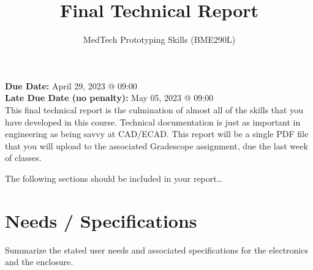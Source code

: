 \documentclass[10pt]{article}
\begin{document}
\title{Final Technical Report} 
\author{MedTech Prototyping Skills (BME290L)}
\maketitle

\textbf{Due Date:} April 29, 2023 @ 09:00\\
\textbf{Late Due Date (no penalty):} May 05, 2023 @ 09:00\\

This final technical report is the culmination of almost all of the skills that
you have developed in this course.  Technical documentation is just as important
in engineering as being savvy at CAD/ECAD.  This report will be a single PDF
file that you will upload to the associated Gradescope assignment, due the last
week of classes.

The following sections should be included in your report\dots

\section{Needs / Specifications}
Summarize the stated user needs and associated specifications for the electronics and the enclosure.
\end{document}
